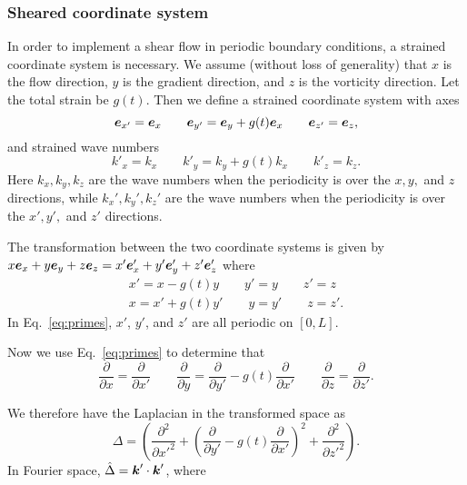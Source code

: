 \subsubsection{Sheared coordinate system}
In order to implement a shear flow in periodic boundary conditions, a strained coordinate system is necessary. We assume (without loss of generality) that $x$ is the flow direction, $y$ is the gradient direction, and $z$ is the vorticity direction. 
Let the total strain be $g(t)$. Then we define a strained coordinate system with axes
\begin{equation}
\label{eq:axes}
\boldsymbol{e}_{x'} = \boldsymbol{e}_x \qquad \boldsymbol{e}_{y'} = \boldsymbol{e}_y+g(t)\boldsymbol{e}_x \qquad \boldsymbol{e}_{z'} = \boldsymbol{e}_z,
\end{equation}
and strained wave numbers
\begin{equation}
\label{eq:swnums}
k'_x=k_x \qquad k'_y = k_y+g(t)k_x \qquad k'_z = k_z.
\end{equation}
Here $k_x, k_y, k_z$ are the wave numbers when the periodicity is over the $x,y,$ and $z$ directions, while $k_x', k_y', k_z'$ are the wave numbers when the periodicity is over the $x',y',$ and $z'$ directions. 

The transformation between the two coordinate systems is given by $x\boldsymbol{e}_x+y\boldsymbol{e}_y+z\boldsymbol{e}_z=x'\boldsymbol{e}'_x+y'\boldsymbol{e}'_y+z'\boldsymbol{e}'_z$ where
\begin{gather}
\label{eq:primes}
x'=x-g(t)y \qquad y'=y \qquad z'=z \\[2 pt]
x=x'+g(t)y' \qquad y=y' \qquad z=z'. 
\end{gather}
In Eq.\ \eqref{eq:primes}, $x'$, $y'$, and $z'$ are all periodic on $[0,L]$. 

Now we use Eq.\ \eqref{eq:primes} to determine that 
\begin{equation}
\frac{\partial}{\partial x} = \frac{\partial}{\partial x'} \qquad \frac{\partial}{\partial y} = \frac{\partial}{\partial y'}-g(t)\frac{\partial}{\partial x'} \qquad \frac{\partial}{\partial z} = \frac{\partial}{\partial z'}. 
\end{equation}

We therefore have the Laplacian in the transformed space as \cite{moto11}
\begin{equation}
\Delta = \left(\frac{\partial^2}{\partial x'^2}+\left(\frac{\partial}{\partial y'}-g(t)\frac{\partial}{\partial x'}\right)^2+\frac{\partial^2}{\partial z'^2}\right). 
\end{equation}
In Fourier space, $\hat{\Delta} = \boldsymbol{k}' \cdot \boldsymbol{k}'$, where 

